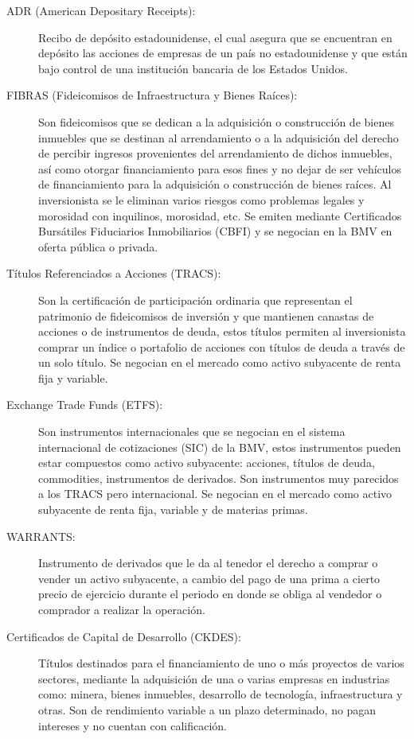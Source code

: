 \documentclass[10pt,letterpaper]{book}
\author{Luis Manuel Guerrero}
\begin{document}
\begin{description}
    \item[ADR (American Depositary Receipts):] \hfill \break Recibo de depósito estadounidense, el cual asegura que se encuentran en depósito las acciones de empresas de un país no estadounidense y que están bajo control de una institución bancaria de los Estados Unidos.
    \item[FIBRAS (Fideicomisos de Infraestructura y Bienes Raíces):] \hfill \break Son fideicomisos que se dedican a la adquisición o construcción de bienes inmuebles que se destinan al arrendamiento o a la adquisición del derecho de percibir ingresos provenientes del arrendamiento de dichos inmuebles, así como otorgar financiamiento para esos fines y no dejar de ser vehículos de financiamiento para la adquisición o construcción de bienes raíces. Al inversionista se le eliminan varios riesgos como problemas legales y morosidad con inquilinos, morosidad, etc. Se emiten mediante Certificados Bursátiles Fiduciarios Inmobiliarios (CBFI) y se negocian en la BMV en oferta pública o privada.
    \item[Títulos Referenciados a Acciones (TRACS):] \hfill \break Son la certificación de participación ordinaria que representan el patrimonio de fideicomisos de inversión y que mantienen canastas de acciones o de instrumentos de deuda, estos títulos permiten al inversionista comprar un índice o portafolio de acciones con títulos de deuda a través de un solo título. Se negocian en el mercado como activo subyacente de renta fija y variable.
    \item[Exchange Trade Funds (ETFS):] \hfill \break Son instrumentos internacionales que se negocian en el sistema internacional de cotizaciones (SIC) de la BMV, estos instrumentos pueden estar compuestos como activo subyacente: acciones, títulos de deuda, commodities, instrumentos de derivados. Son instrumentos muy parecidos a los TRACS pero internacional. Se negocian en el mercado como activo subyacente de renta fija, variable y de materias primas.
    \item[WARRANTS:]  \hfill \break Instrumento de derivados que le da al tenedor el derecho a comprar o vender un activo subyacente, a cambio del pago de una prima a cierto precio de ejercicio durante el periodo en donde se obliga al vendedor o comprador a realizar la operación.
    \item[Certificados de Capital de Desarrollo (CKDES):] \hfill \break Títulos destinados para el financiamiento de uno o más proyectos de varios sectores, mediante la adquisición de una o varias empresas en industrias como: minera, bienes inmuebles, desarrollo de tecnología, infraestructura y otras. Son de rendimiento variable a un plazo determinado, no pagan intereses y no cuentan con calificación.

\end{description}
\end{document}
